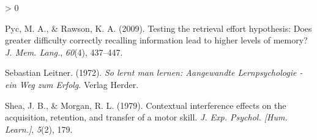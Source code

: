\documentclass[
  notoc %
]{tufte-book}
\newlength{\cslhangindent}
\newenvironment{CSLReferences}[2] %
 {%
  \setlength{\parindent}{0pt}
  \ifodd #1 \everypar{\setlength{\hangindent}{\cslhangindent}}\ignorespaces\fi
  \ifnum #2 > 0
  \setlength{\parskip}{#2\baselineskip}
  \fi
 }%
 {}
\begin{document}
\begin{CSLReferences}{1}{0}
\leavevmode\hypertarget{ref-pyc2009testing}{}%
Pyc, M. A., \& Rawson, K. A. (2009). Testing the retrieval effort
hypothesis: {Does} greater difficulty correctly recalling information
lead to higher levels of memory? \emph{J. Mem. Lang.}, \emph{60}(4),
437--447.

\leavevmode\hypertarget{ref-sebastianleitnerLerntManLernen1972}{}%
Sebastian Leitner. (1972). \emph{So lernt man lernen: {Aangewandte
Lernpsychologie} - ein {Weg} zum {Erfolg}}. {Verlag Herder}.

\leavevmode\hypertarget{ref-shea1979contextual}{}%
Shea, J. B., \& Morgan, R. L. (1979). Contextual interference effects on
the acquisition, retention, and transfer of a motor skill. \emph{J. Exp.
Psychol. {[}Hum. Learn.{]}}, \emph{5}(2), 179.

\end{CSLReferences}

\backmatter
\end{document}
